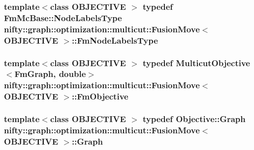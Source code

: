 \subsubsection[{Fm\+Node\+Labels\+Type}]{\setlength{\rightskip}{0pt plus 5cm}template$<$class O\+B\+J\+E\+C\+T\+I\+V\+E $>$ typedef {\bf Fm\+Mc\+Base\+::\+Node\+Labels\+Type} {\bf nifty\+::graph\+::optimization\+::multicut\+::\+Fusion\+Move}$<$ O\+B\+J\+E\+C\+T\+I\+V\+E $>$\+::{\bf Fm\+Node\+Labels\+Type}}\label{classnifty_1_1graph_1_1optimization_1_1multicut_1_1FusionMove_a283c909a0176f78b4ad7ad56c2dfcff2}
\hypertarget{classnifty_1_1graph_1_1optimization_1_1multicut_1_1FusionMove_a57b32cd719f50645876f2ac200f9932b}{}
\subsubsection[{Fm\+Objective}]{\setlength{\rightskip}{0pt plus 5cm}template$<$class O\+B\+J\+E\+C\+T\+I\+V\+E $>$ typedef {\bf Multicut\+Objective}$<${\bf Fm\+Graph}, double$>$ {\bf nifty\+::graph\+::optimization\+::multicut\+::\+Fusion\+Move}$<$ O\+B\+J\+E\+C\+T\+I\+V\+E $>$\+::{\bf Fm\+Objective}}\label{classnifty_1_1graph_1_1optimization_1_1multicut_1_1FusionMove_a57b32cd719f50645876f2ac200f9932b}
\hypertarget{classnifty_1_1graph_1_1optimization_1_1multicut_1_1FusionMove_a445f69d8de37009f03510671ae041ca9}{}
\subsubsection[{Graph}]{\setlength{\rightskip}{0pt plus 5cm}template$<$class O\+B\+J\+E\+C\+T\+I\+V\+E $>$ typedef Objective\+::\+Graph {\bf nifty\+::graph\+::optimization\+::multicut\+::\+Fusion\+Move}$<$ O\+B\+J\+E\+C\+T\+I\+V\+E $>$\+::{\bf Graph}}\label{classnifty_1_1graph_1_1optimization_1_1multicut_1_1FusionMove_a445f69d8de37009f03510671ae041ca9}
\hypertarget{classnifty_1_1graph_1_1optimization_1_1multicut_1_1FusionMove_a29ffe23abd07d62d8a952441d1ebef45}{}
